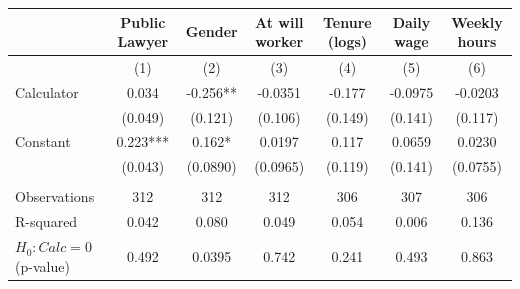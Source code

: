 \begin{tabular}{lcccccc}
\toprule
      & Public Lawyer & Gender & At will worker & Tenure (logs) & Daily wage & Weekly hours \\
\midrule
\midrule
      & (1)   & (2)   & (3)   & (4)   & (5)   & (6) \\
\midrule
\midrule
Calculator & 0.034 & -0.256** & -0.0351 & -0.177 & -0.0975 & -0.0203 \\
      & (0.049) & (0.121) & (0.106) & (0.149) & (0.141) & (0.117) \\
Constant & 0.223*** & 0.162* & 0.0197 & 0.117 & 0.0659 & 0.0230 \\
      & (0.043) & (0.0890) & (0.0965) & (0.119) & (0.141) & (0.0755) \\
      &       &       &       &       &       &  \\
\midrule
Observations & 312   & 312   & 312   & 306   & 307   & 306 \\
R-squared & 0.042 & 0.080 & 0.049 & 0.054 & 0.006 & 0.136 \\
$H_0 : Calc = 0$  (p-value) & 0.492 & 0.0395 & 0.742 & 0.241 & 0.493 & 0.863 \\
\bottomrule
\bottomrule
\end{tabular}%
